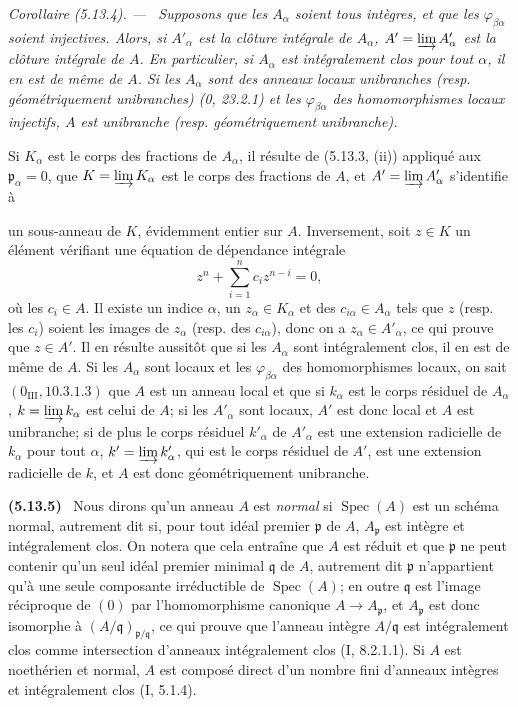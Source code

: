 \documentclass[10pt,oneside]{book}
\newcommand{\oldpage}[2][]{%
  \setcounter{footnote}{0}%
  \marginpar{\scriptsize\textbf{#1}~|~#2}\ignorespaces}
\newenvironment{env}[1][]{\par\medskip\noindent\textbf{(#1)}\ }{\par}
\newenvironment{corollary}[1][]{%
  \par\medskip\noindent\itshape Corollaire (#1). ---\ }{\par}
\begin{document}
\begin{corollary}[5.13.4]
\label{IV.2.s5.13.4-fr}
Supposons que les $A_\alpha$ soient tous intègres, et que les
$\varphi_{\beta\alpha}$ soient injectives. Alors, si $A'_\alpha$ est la clôture
intégrale de $A_\alpha$, $A'=\varinjlim A'_\alpha$ est la clôture intégrale de
$A$. En particulier, si $A_\alpha$ est intégralement clos pour tout $\alpha$,
il en est de même de $A$. Si les $A_\alpha$ sont des anneaux locaux unibranches
(resp. géométriquement unibranches) (0, 23.2.1) et les
$\varphi_{\beta\alpha}$ des homomorphismes locaux injectifs, $A$ est unibranche
(resp. géométriquement unibranche).
\end{corollary}

Si $K_\alpha$ est le corps des fractions de $A_\alpha$, il résulte de (5.13.3,
(ii)) appliqué aux $\mathfrak p_\alpha=0$, que
$K=\varinjlim K_\alpha$ est le corps des fractions de $A$, et
$A'=\varinjlim A'_\alpha$ s'identifie à

\oldpage[IV-2]{133}

un sous-anneau de $K$, évidemment entier sur $A$. Inversement, soit $z\in K$
un élément vérifiant une équation de dépendance intégrale
\[
z^n+\sum_{i=1}^{n}c_i z^{n-i}=0,
\]
où les $c_i\in A$. Il existe un indice $\alpha$, un $z_\alpha\in K_\alpha$ et
des $c_{i\alpha}\in A_\alpha$ tels que $z$ (resp. les $c_i$) soient les images
de $z_\alpha$ (resp. des $c_{i\alpha}$), donc on a
$z_\alpha\in A'_\alpha$, ce qui prouve que $z\in A'$. Il en résulte aussitôt
que si les $A_\alpha$ sont intégralement clos, il en est de même de $A$. Si les
$A_\alpha$ sont locaux et les $\varphi_{\beta\alpha}$ des homomorphismes
locaux, on sait $(0_{\mathrm{III}}, 10.3.1.3)$ que $A$ est un anneau local et
que si $k_\alpha$ est le corps résiduel de $A_\alpha$,
$k=\varinjlim k_\alpha$ est celui de $A$; si les $A'_\alpha$ sont locaux, $A'$
est donc local et $A$ est unibranche; si de plus le corps résiduel
$k'_\alpha$ de $A'_\alpha$ est une extension radicielle de $k_\alpha$ pour
tout $\alpha$, $k'=\varinjlim k'_\alpha$, qui est le corps résiduel de $A'$,
est une extension radicielle de $k$, et $A$ est donc géométriquement
unibranche.

\begin{env}[5.13.5]
\label{IV.2.s5.13.5-fr}
Nous dirons qu'un anneau $A$ est \emph{normal} si
$\operatorname{Spec}(A)$ est un schéma normal, autrement dit si, pour tout
idéal premier $\mathfrak p$ de $A$, $A_{\mathfrak p}$ est intègre et
intégralement clos. On notera que cela entraîne que $A$ est réduit et que
$\mathfrak p$ ne peut contenir qu'un seul idéal premier minimal $\mathfrak q$
de $A$, autrement dit $\mathfrak p$ n'appartient qu'à une seule composante
irréductible de $\operatorname{Spec}(A)$; en outre $\mathfrak q$ est l'image
réciproque de $(0)$ par l'homomorphisme canonique
$A\to A_{\mathfrak p}$, et $A_{\mathfrak p}$ est donc isomorphe à
$(A/\mathfrak q)_{\mathfrak p/\mathfrak q}$, ce qui prouve que l'anneau
intègre $A/\mathfrak q$ est intégralement clos comme intersection d'anneaux
intégralement clos (I, 8.2.1.1). Si $A$ est noethérien et normal, $A$ est
composé direct d'un nombre fini d'anneaux intègres et intégralement clos (I,
5.1.4).
\end{env}
\end{document}
